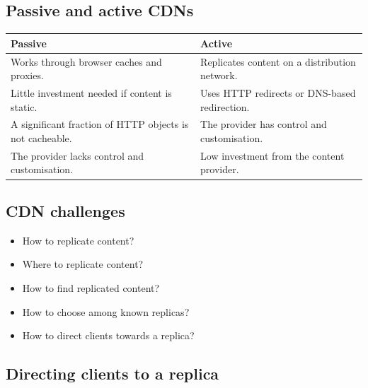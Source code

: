 \documentclass[11pt,a4paper]{article}
\begin{document}


\subsection{Passive and active CDNs}

\begin{tabularx}{\textwidth}{@{}XX@{}}
\toprule
\rowcolor{tablehead}\textbf{Passive} & \textbf{Active} \\
\midrule
Works through browser caches and proxies. & Replicates content on a distribution network. \\
Little investment needed if content is static. & Uses HTTP redirects or DNS-based
  redirection. \\
A significant fraction of HTTP objects is not cacheable. & The provider has control and
  customisation. \\
The provider lacks control and customisation. & Low investment from the content provider. \\
\bottomrule
\end{tabularx}

\subsection{CDN challenges}

\begin{itemize}\itemsep2pt
  \item How to replicate content?
  \item Where to replicate content?
  \item How to find replicated content?
  \item How to choose among known replicas?
  \item How to direct clients towards a replica?
\end{itemize}

\subsection{Directing clients to a replica}


\end{document}
